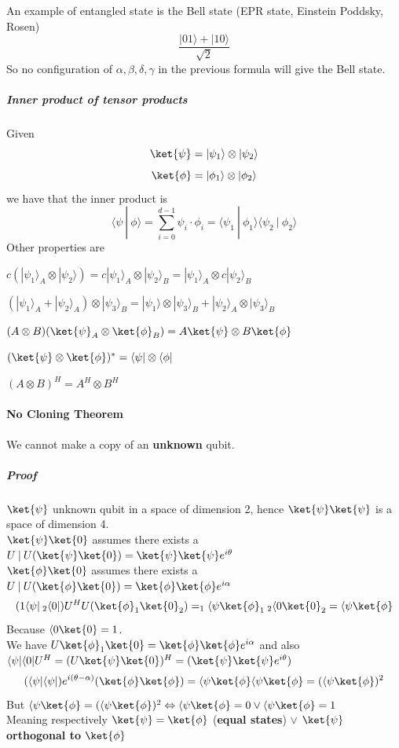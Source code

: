 \documentclass[10pt]{report}
\begin{document}
An example of entangled state is the Bell state (EPR state, Einstein Poddsky, Rosen) $$\frac{|01\rangle + |10\rangle}{\sqrt{2}}$$
So no configuration of $\alpha,\beta,\delta,\gamma$ in the previous formula will give the Bell state.
\subparagraph{Inner product of tensor products} Given
$$\ket{\psi} = |\psi_1\rangle\otimes|\psi_2\rangle$$
$$\ket{\phi} = |\phi_1\rangle\otimes|\phi_2\rangle$$
we have that the inner product is
$$\langle \psi\:|\:\phi\rangle = \sum_{i=0}^{d-1}\psi_i\cdot\phi_i = \langle \psi_1\:|\:\phi_1\rangle\langle \psi_2\:|\:\phi_2\rangle$$
Other properties are\begin{list}{}{}
	\item $c(|\psi_1\rangle_A\otimes|\psi_2\rangle) = c|\psi_1\rangle_A\otimes |\psi_2\rangle_B = |\psi_1\rangle_A\otimes c|\psi_2\rangle_B$
	\item $(|\psi_1\rangle_A+|\psi_2\rangle_A)\otimes|\psi_3\rangle_B = |\psi_1\rangle\otimes|\psi_3\rangle_B + |\psi_2\rangle_A\otimes|\psi_3\rangle_B$
	\item $(A\otimes B)(\ket{\psi}_A\otimes\ket{\phi}_B) = A\ket{\psi} \otimes B\ket{\phi}$
	\item $(\ket{\psi}\otimes\ket{\phi})^* = \langle\psi|\otimes\langle\phi|$
	\item $(A\otimes B)^H = A^H\otimes B^H$
\end{list}
\paragraph{No Cloning Theorem} We cannot make a copy of an \textbf{unknown} qubit.
\subparagraph{Proof} $\ket{\psi}$ unknown qubit in a space of dimension 2, hence $\ket{\psi}\ket{\psi}$ is a space of dimension 4.\\
$\ket{\psi}\ket{0}$ assumes there exists a $U\:|\:U(\ket{\psi}\ket{0})=\ket{\psi}\ket{\psi} e^{i\theta}$\\
$\ket{\phi}\ket{0}$ assumes there exists a $U\:|\:U(\ket{\phi}\ket{0})=\ket{\phi}\ket{\phi} e^{i\alpha}$
$$(1\langle\psi|\:_2\langle 0|)U^HU(\ket{\phi}_1\ket{0}_2) = _1\langle\psi\ket{\phi}_1\:_2\langle0\ket{0}_2 = \langle\psi\ket{\phi}$$
Because $\langle0\ket{0} = 1$.\\
We have $U\ket{\phi}_1\ket{0} = \ket{\phi}\ket{\phi} e^{i\alpha}$ and also $\langle\psi|\langle 0|U^H = (U\ket{\psi}\ket{0})^H = (\ket{\psi}\ket{\psi} e^{i\theta})$
$$(\langle\psi|\langle\psi|)e^{i(\theta-\alpha)}(\ket{\phi}\ket{\phi}) = \langle\psi\ket{\phi}\langle\psi\ket{\phi} = (\langle\psi\ket{\phi})^2$$
But $\langle\psi\ket{\phi} = (\langle\psi\ket{\phi})^2 \Leftrightarrow \langle\psi\ket{\phi} = 0 \vee \langle\psi\ket{\phi} = 1$\\
Meaning respectively $\ket{\psi} = \ket{\phi}$ (\textbf{equal states}) $\vee$ $\ket{\psi}$ \textbf{orthogonal to} $\ket{\phi}$
\end{document}
